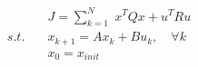 \documentclass[preview]{standalone}
\begin{document}
\begin{align*}
\quad &J = \sum_{k=1}^N \; x^TQx + u^T R u \\ s.t. \quad &x_{k+1} = Ax_k + Bu_k, \quad \forall k \\ &x_0 = x_{init}
\end{align*}
\end{document}
